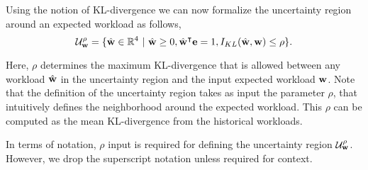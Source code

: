 Using the notion of KL-divergence we can now formalize the uncertainty
    region around an expected workload {\workload} as follows,
    \begin{equation}\label{eq:workloaduncertaintyregion}
        \mathcal{U}_{{{\bf{w}}}}^\rho = \{{{\hat{\bf{w}}}} \in \mathbb{R}^4\textrm{
            }|\textrm{  } {{\ensuremath{\hat{\bf{w}}}}}
    \geq 0, {{\hat{\bf{w}}}}^\intercal{{\ensuremath{\bf{e}}}} = 1, I_{KL}({{\hat{\bf{w}}}},
    {{\bf{w}}}) \leq \rho\}.
    \end{equation}
   
Here, $\rho$ determines the maximum KL-divergence that is allowed between any
    workload ${{\hat{\bf{w}}}}$ in the uncertainty region and the input expected
    workload ${{\bf{w}}}$. 
Note that the definition of the uncertainty region takes as input the parameter
    $\rho$, that intuitively defines the neighborhood around the expected
    workload. 
This $\rho$ can be computed as the mean KL-divergence from the historical
    workloads.  

In terms of notation, $\rho$ input is required for defining the uncertainty
    region $\mathcal{U}_{{\bf{w}}}^\rho$.
However, we drop the superscript notation unless required for context.

